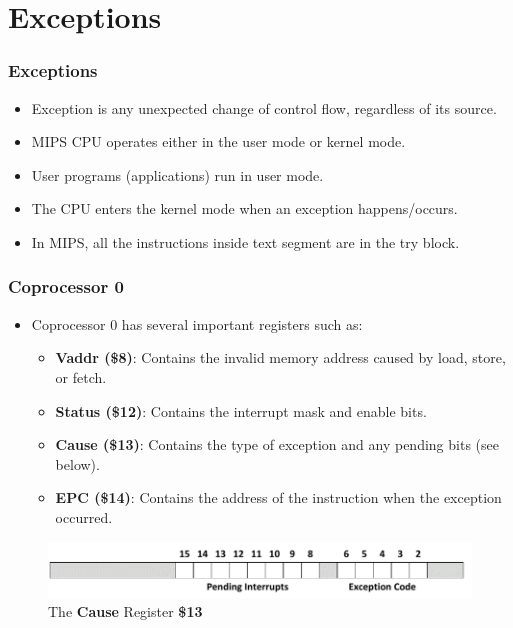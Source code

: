 \documentclass[
	11pt, %
]{beamer}
\begin{document}
\section{Exceptions} %
\begin{frame}
	\frametitle{Exceptions}
	
	\begin{itemize}
		\item Exception is any unexpected change of control flow, regardless of its source. \pause 
		\item MIPS CPU operates either in the user mode or kernel mode. \pause
		\item User programs (applications) run in user mode. \pause
		\item The CPU enters the kernel mode when an exception happens/occurs. \pause
		\item In MIPS, all the instructions inside text segment are in the try block.
	\end{itemize}

\end{frame}



\begin{frame}
	\frametitle{Coprocessor 0}
	\begin{itemize}
		\item Coprocessor 0 has several important registers such as:
		\begin{itemize}
			\item \textbf{Vaddr (\color{red}\$8\color{black})}: Contains the invalid memory address caused by load, store, or fetch. \pause
			\item \textbf{Status (\color{red}\$12\color{black})}: Contains the interrupt mask and enable bits. \pause
			\item \textbf{Cause (\color{red}\$13\color{black})}: Contains the type of exception and any pending bits (see below). \pause
			\item \textbf{EPC (\color{red}\$14\color{black})}: Contains the address of the instruction when the exception occurred. \pause
		\end{itemize}
	\end{itemize}
	\begin{figure}
		\includegraphics[width=\linewidth]{cause_register.png}
		\caption{The \textbf{Cause} Register \textbf{\$13}}
	\end{figure}
\end{frame}
\end{document}
